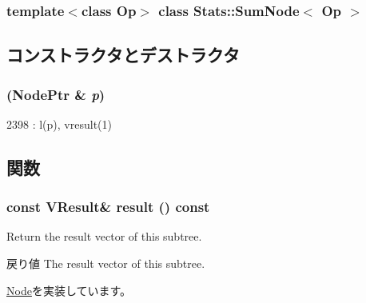 \subsubsection*{template$<$class Op$>$ class Stats::SumNode$<$ Op $>$}



\subsection{コンストラクタとデストラクタ}
\hypertarget{classStats_1_1SumNode_addf050808d112444523fdc74f5f77f5d}{
\subsubsection[{SumNode}]{ ({\bf NodePtr} \& {\em p})}}
\label{classStats_1_1SumNode_addf050808d112444523fdc74f5f77f5d}



\begin{DoxyCode}
2398 : l(p), vresult(1) {}
\end{DoxyCode}


\subsection{関数}
\hypertarget{classStats_1_1SumNode_aba312f9e3431b1652f8b3ddf3fe105dc}{
\subsubsection[{result}]{\setlength{\rightskip}{0pt plus 5cm}const {\bf VResult}\& result () const}}
\label{classStats_1_1SumNode_aba312f9e3431b1652f8b3ddf3fe105dc}
Return the result vector of this subtree. \begin{DoxyReturn}{戻り値}
The result vector of this subtree. 
\end{DoxyReturn}


\hyperlink{classStats_1_1Node_a7fcf57115122663db42f39cc18ca0f62}{Node}を実装しています。


